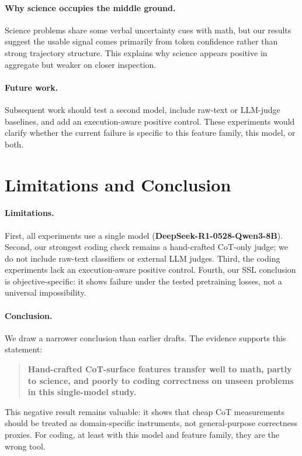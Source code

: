 \documentclass[10pt,twocolumn]{article}
\begin{document}
\paragraph{Why science occupies the middle ground.}
Science problems share some verbal uncertainty cues with math, but our results suggest the usable signal comes primarily from token confidence rather than strong trajectory structure. This explains why science appears positive in aggregate but weaker on closer inspection.

\paragraph{Future work.}
Subsequent work should test a second model, include raw-text or LLM-judge baselines, and add an execution-aware positive control. These experiments would clarify whether the current failure is specific to this feature family, this model, or both.

\section{Limitations and Conclusion}
\label{sec:limits}

\paragraph{Limitations.}
First, all experiments use a single model (\textbf{DeepSeek-R1-0528-Qwen3-8B}). Second, our strongest coding check remains a hand-crafted CoT-only judge; we do not include raw-text classifiers or external LLM judges. Third, the coding experiments lack an execution-aware positive control. Fourth, our SSL conclusion is objective-specific: it shows failure under the tested pretraining losses, not a universal impossibility.

\paragraph{Conclusion.}
We draw a narrower conclusion than earlier drafts. The evidence supports this statement:

\begin{quote}
\textbf{Hand-crafted CoT-surface features transfer well to math, partly to science, and poorly to coding correctness on unseen problems in this single-model study.}
\end{quote}

This negative result remains valuable: it shows that cheap CoT measurements should be treated as domain-specific instruments, not general-purpose correctness proxies. For coding, at least with this model and feature family, they are the wrong tool.
\end{document}
